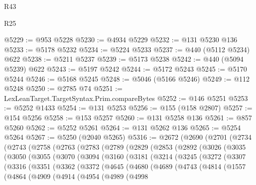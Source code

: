 \begin{lexlean}{R43}
\begin{lexlean}{R25}
\begin{coremodule}
{{{{{{{{{{{{{{{{{{{{{{{{{{{{{{{{{{{{{{{{{{{{{{{{{{{{{{{{{{{{{{{{{{{{{{{{{{{{{{{{{{{{{{{{{{{{{{{{{{{{{{{{{{{{{{{{{{{{{{{{{{{{{{{{{{{{{{{{{{{{{{{{{{{{{{{{{{{{{{{{{{{{{{{{{{{{{{{{{{{{{{{{{{{{{{{{{@5229 := @953 @5228
@5230 := @4934 @5229
@5232 := @131 @5230 @136
@5233 := @5178 @5232
@5234 := @5224 @5233
@5237 := @440 (@5112 @5234) @622
@5238 := @5211 @5237
@5239 := @5173 @5238
@5242 := @440 (@5094 @5239) @622
@5243 := @5197 @5242
@5244 := @5172 @5243
@5245 := @5170 @5244
@5246 := @5168 @5245
@5248 := @5046 (@5166 @5246)
@5249 := @112 @5248
@5250 := @2785 @74
@5251 := LexLeanTarget.TargetSyntax.Prim.compareBytes
@5252 := @146 @5251
@5253 := @5252 @1433
@5254 := @131 @5253
@5256 := @155 (@158 @2807)
@5257 := @154 @5256
@5258 := @153 @5257
@5260 := @131 @5258 @136
@5261 := @857 @5260
@5262 := @5252 @5261
@5264 := @131 @5262 @136
@5265 := @5254 @5264
@5267 := @5250 (@2040 @5265)
@5316 := @2672
    (@2690
      (@2701
        (@2734
          (@2743
            (@2758
              (@2763
                (@2783
                  (@2789
                    (@2829
                      (@2853
                        (@2892
                          (@3026
                            (@3035
                              (@3050
                                (@3055
                                  (@3070
                                    (@3094
                                      (@3160
                                        (@3181
                                          (@3214
                                            (@3245
                                              (@3272
                                                (@3307
                                                  (@3316
                                                    (@3351
                                                      (@3362
                                                        (@3372
                                                          (@4645
                                                            (@4680
                                                              (@4689
                                                                (@4743
                                                                  (@4814
                                                                    (@1557
                                                                      (@4864
                                                                        (@4909
                                                                          (@4914
                                                                            (@4954
                                                                              (@4989
                                                                                (@4998
}}}}}}}}}}}}}}}}}}}}}}}}}}}}}}}}}}}}}}}}}}}}}}}}}}}}}}}}}}}}}}}}}}}}}}}}}}}}}}}}}}}}}}}}}}}}}}}}}}}}}}}}}}}}}}}}}}}}}}}}}}}}}}}}}}}}}}}}}}}}}}}}}}}}}}}}}}}}}}}}}}}}}}}}}}}}}}}}}}}}}}}}}}}}}}}}}
\end{coremodule}
\end{lexlean}
\end{lexlean}
